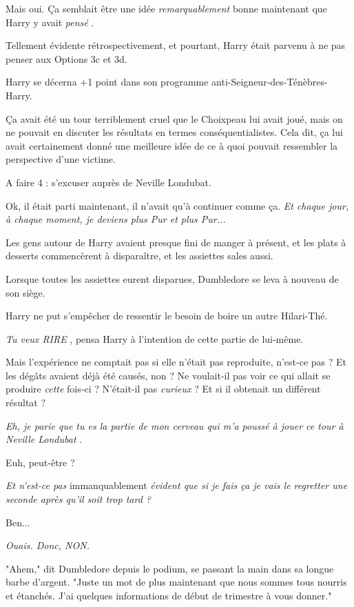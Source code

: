 Mais oui. Ça semblait être une idée \emph{remarquablement } bonne maintenant que Harry y avait \emph{pensé} .

Tellement évidente rétrospectivement, et pourtant, Harry était parvenu à ne pas penser aux Options 3c et 3d.

Harry se décerna +1 point dans son programme anti-Seigneur-des-Ténèbres-Harry.

Ça avait été un tour terriblement cruel que le Choixpeau lui avait joué, mais on ne pouvait en discuter les résultats en termes conséquentialistes. Cela dit, ça lui avait certainement donné une meilleure idée de ce à quoi pouvait ressembler la perspective d'une victime.

A faire 4 : s'excuser auprès de Neville Londubat.

Ok, il était parti maintenant, il n'avait qu'à continuer comme ça. \emph{Et chaque jour, à chaque moment, je deviens plus Pur et plus Pur...} 

Les gens autour de Harry avaient presque fini de manger à présent, et les plats à desserts commencèrent à disparaître, et les assiettes sales aussi.

Lorsque toutes les assiettes eurent disparues, Dumbledore se leva à nouveau de son siège.

Harry ne put s'empêcher de ressentir le besoin de boire un autre Hilari-Thé.

\emph{Tu veux RIRE} , pensa Harry à l'intention de cette partie de lui-même.

Mais l'expérience ne comptait pas si elle n'était pas reproduite, n'est-ce pas ? Et les dégâts avaient déjà été causés, non ? Ne voulait-il pas voir ce qui allait se produire \emph{cette}  fois-ci ? N'était-il pas \emph{curieux}  ? Et si il obtenait un différent résultat ?

\emph{Eh, je parie que tu es la partie de mon cerveau qui m'a poussé à jouer ce tour à Neville Londubat} .

Euh, peut-être ?

\emph{Et n'est-ce pas } immanquablement\emph{ évident que si je fais ça je vais le regretter une seconde après qu'il soit trop tard ?} 

Ben...

\emph{Ouais. Donc, NON.} 

"Ahem," dit Dumbledore depuis le podium, se passant la main dans sa longue barbe d'argent. "Juste un mot de plus maintenant que nous sommes tous nourris et étanchés. J'ai quelques informations de début de trimestre à vous donner."

